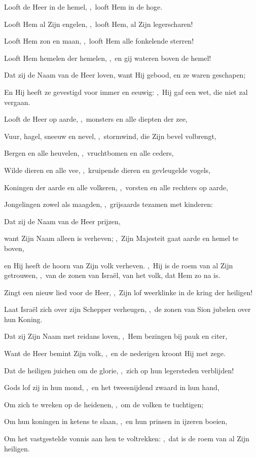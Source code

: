 \documentclass[12pt,twoside,a5paper]{article}
\begin{document}
\begin{halfparskip}
   Looft de Heer in de hemel, \sep\ looft Hem in de hoge.

  Looft Hem al Zijn engelen, \sep\ looft Hem, al Zijn legerscharen!

  Looft Hem zon en maan, \sep\ looft Hem alle fonkelende sterren!

  Looft Hem hemelen der hemelen, \sep\ en gij wateren boven de hemel!

  Dat zij de Naam van de Heer loven, want Hij gebood, en ze waren geschapen;

  En Hij heeft ze gevestigd voor immer en eeuwig: \sep\ Hij gaf een wet, die niet zal vergaan.

  Looft de Heer op aarde, \sep\ monsters en alle diepten der zee,

  Vuur, hagel, sneeuw en nevel, \sep\ stormwind, die Zijn bevel volbrengt,

  Bergen en alle heuvelen, \sep\ vruchtbomen en alle ceders,

  Wilde dieren en alle vee, \sep\ kruipende dieren en gevleugelde vogels,

  Koningen der aarde en alle volkeren, \sep\ vorsten en alle rechters op aarde,

  Jongelingen zowel als maagden, \sep\ grijsaards tezamen met kinderen:

  Dat zij de Naam van de Heer prijzen,

  want Zijn Naam alleen is verheven; \sep\ Zijn Majesteit gaat aarde en hemel te boven,

  en Hij heeft de hoorn van Zijn volk verheven. \sep\ Hij is de roem van al Zijn getrouwen, \sep\ van de zonen van Israël, van het volk, dat Hem zo na is.
\end{halfparskip}

\begin{halfparskip}
   Zingt een nieuw lied voor de Heer, \sep\ Zijn lof weerklinke in de kring der heiligen!

  Laat Israël zich over zijn Schepper verheugen, \sep\ de zonen van Sion jubelen over hun Koning.

  Dat zij Zijn Naam met reidans loven, \sep\ Hem bezingen bij pauk en citer,

  Want de Heer bemint Zijn volk, \sep\ en de nederigen kroont Hij met zege.

  Dat de heiligen juichen om de glorie, \sep\ zich op hun legersteden verblijden!

  Gods lof zij in hun mond, \sep\ en het tweesnijdend zwaard in hun hand,

  Om zich te wreken op de heidenen, \sep\ om de volken te tuchtigen;

  Om hun koningen in ketens te slaan, \sep\ en hun prinsen in ijzeren boeien,

  Om het vastgestelde vonnis aan hen te voltrekken: \sep\ dat is de roem van al Zijn heiligen.
\end{halfparskip}
\end{document}
